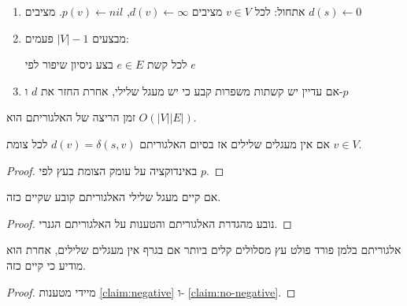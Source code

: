 \begin{enumerate}
\item
אתחול: לכל
$v \in V$
מציבים 
$d(v) \leftarrow \infty$, 
$p(v) \leftarrow nil$.
מציבים
$d(s) \leftarrow 0$
\item
מבצעים 
$|V| - 1$
פעמים:
\begin{enumerate}
לכל קשת 
$e \in E$
בצע ניסיון שיפור לפי $e$
\end{enumerate}
\item
אם עדיין יש קשתות משפרות קבע כי יש מעגל שלילי, אחרת החזר את $d$ ו-$p$
\end{enumerate}

זמן הריצה של האלגוריתם הוא 
$O(|V||E|)$.

\begin{claim}
\label{claim:no-negative}
אם אין מעגלים שלילים אז בסיום האלגוריתם
$d(v) = \delta(s,v)$
לכל צומת 
$v \in V$.
\end{claim}

\begin{proof}
באינדוקציה על עומק הצומת בעץ לפי $p$.
\end{proof}

\begin{claim}
\label{claim:negative}
אם קיים מעגל שלילי האלגוריתם קובע שקיים כזה.
\end{claim}

\begin{proof}
נובע מהגדרת האלגוריתם והטענות על האלגוריתם הגנרי.
\end{proof}

\begin{theorem}
אלגוריתם בלמן פורד פולט עץ מסלולים קלים ביותר אם בגרף אין מעגלים שלילים, 
אחרת הוא מודיע כי קיים כזה.
\end{theorem}

\begin{proof}
מיידי מטענות 
\ref{claim:negative}
ו-%
\ref{claim:no-negative}.
\end{proof}

